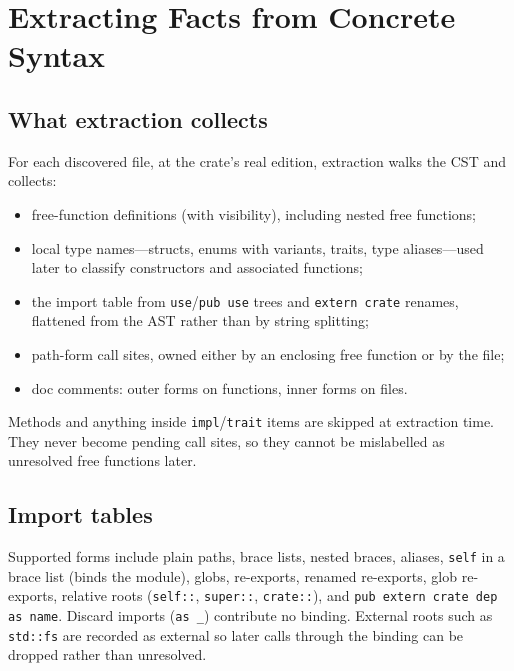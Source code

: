 \documentclass[11pt,a4paper,oneside]{report}
\begin{document}
\chapter{Extracting Facts from Concrete Syntax}
\label{ch:extract}

\section{What extraction collects}

For each discovered file, at the crate's real edition, extraction walks the
CST and collects:

\begin{itemize}[nosep]
  \item free-function definitions (with visibility), including nested free
    functions;
  \item local type names---structs, enums with variants, traits, type
    aliases---used later to classify constructors and associated functions;
  \item the import table from \texttt{use}/\texttt{pub use} trees and
    \texttt{extern crate} renames, flattened from the AST rather than by
    string splitting;
  \item path-form call sites, owned either by an enclosing free function or
    by the file;
  \item doc comments: outer forms on functions, inner forms on files.
\end{itemize}

Methods and anything inside \texttt{impl}/\texttt{trait} items are skipped at
extraction time. They never become pending call sites, so they cannot be
mislabelled as unresolved free functions later.

\section{Import tables}

Supported forms include plain paths, brace lists, nested braces, aliases,
\texttt{self} in a brace list (binds the module), globs, re-exports, renamed
re-exports, glob re-exports, relative roots (\texttt{self::}, \texttt{super::},
\texttt{crate::}), and \texttt{pub extern crate dep as name}. Discard imports
(\texttt{as \_}) contribute no binding. External roots such as
\texttt{std::fs} are recorded as external so later calls through the binding
can be dropped rather than unresolved.
\end{document}
